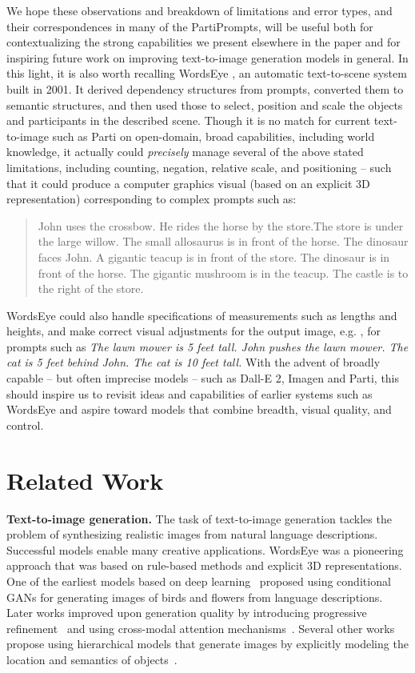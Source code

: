 We hope these observations and breakdown of limitations and error types, and their correspondences in many of the PartiPrompts, will be useful both for contextualizing the strong capabilities we present elsewhere in the paper and for inspiring future work on improving text-to-image generation models in general. In this light, it is also worth recalling WordsEye \cite{coyne2001wordseye}, an automatic text-to-scene system built in 2001. It derived dependency structures from prompts, converted them to semantic structures, and then used those to select, position and scale the objects and participants in the described scene. Though it is no match for current text-to-image such as Parti on open-domain, broad capabilities, including world knowledge, it actually could \textit{precisely} manage several of the above stated limitations, including counting, negation, relative scale, and positioning -- such that it could produce a computer graphics visual (based on an explicit 3D representation) corresponding to complex prompts such as:

\begin{quote}
John uses the crossbow. He rides the horse by the store.The store is under the large willow. The small allosaurus is in front of the horse. The dinosaur faces John. A gigantic teacup is in front of the store. The dinosaur is in front of the horse. The gigantic mushroom is in the teacup. The castle is to the right of the store.
\end{quote}

WordsEye could also handle specifications of measurements such as lengths and heights, and make correct visual adjustments for the output image, e.g. , for prompts such as \textit{The lawn mower is 5 feet tall. John pushes the lawn mower. The cat is 5 feet behind John. The cat is 10 feet tall.} With the advent of broadly capable -- but often imprecise models -- such as Dall-E 2, Imagen and Parti, this should inspire us to revisit ideas and capabilities of earlier systems such as WordsEye and aspire toward models that combine breadth, visual quality, and control.

\section{Related Work}
\textbf{Text-to-image generation.} The task of text-to-image generation tackles the problem of synthesizing realistic images from natural language descriptions. Successful models enable many creative applications. WordsEye \cite{coyne2001wordseye} was a pioneering approach that was based on rule-based methods and explicit 3D representations. One of the earliest models based on deep learning~\cite{reed2016generative} proposed using conditional GANs for generating images of birds and flowers from language descriptions. Later works improved upon generation quality by introducing progressive refinement~\cite{Han17, Han17stackgan2} and using cross-modal attention mechanisms~\cite{Xu18, zhang2021cross}. Several other works propose using hierarchical models that generate images by explicitly modeling the location and semantics of objects~\cite{reed2016learning, HongYCL18, HinzHW19, trecs2020}.

